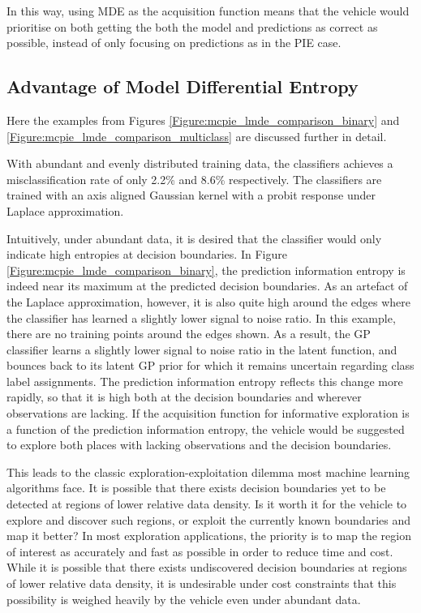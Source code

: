 			In this way, using MDE as the acquisition function means that the vehicle would prioritise on both getting the both the model and predictions as correct as possible, instead of only focusing on predictions as in the PIE case.
			
		\subsection{Advantage of Model Differential Entropy}
		\label{InformativeSeafloorExploration:ComparisonMutualEntropyMeasures:AdvantagesMDE}
		
			Here the examples from Figures \ref{Figure:mcpie_lmde_comparison_binary} and \ref{Figure:mcpie_lmde_comparison_multiclass} are discussed further in detail.
			
			With abundant and evenly distributed training data, the classifiers achieves a misclassification rate of only 2.2\% and 8.6\% respectively. The classifiers are trained with an axis aligned Gaussian kernel with a probit response under Laplace approximation. 
			
			Intuitively, under abundant data, it is desired that the classifier would only indicate high entropies at decision boundaries. In Figure \ref{Figure:mcpie_lmde_comparison_binary}, the prediction information entropy is indeed near its maximum at the predicted decision boundaries. As an artefact of the Laplace approximation, however, it is also quite high around the edges where the classifier has learned a slightly lower signal to noise ratio. In this example, there are no training points around the edges shown. As a result, the GP classifier learns a slightly lower signal to noise ratio in the latent function, and bounces back to its latent GP prior for which it remains uncertain regarding class label assignments. The prediction information entropy reflects this change more rapidly, so that it is high both at the decision boundaries and wherever observations are lacking. If the acquisition function for informative exploration is a function of the prediction information entropy, the vehicle would be suggested to explore both places with lacking observations and the decision boundaries. 
	
			This leads to the classic exploration-exploitation dilemma most machine learning algorithms face. It is possible that there exists decision boundaries yet to be detected at regions of lower relative data density. Is it worth it for the vehicle to explore and discover such regions, or exploit the currently known boundaries and map it better? In most exploration applications, the priority is to map the region of interest as accurately and fast as possible in order to reduce time and cost. While it is possible that there exists undiscovered decision boundaries at regions of lower relative data density, it is undesirable under cost constraints that this possibility is weighed heavily by the vehicle even under abundant data.
					
